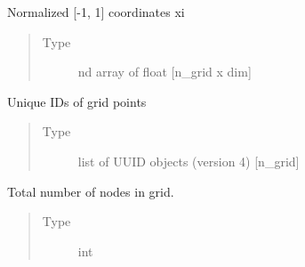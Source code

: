 \documentclass[letterpaper,10pt,english,openany,oneside]{sphinxmanual}
\begin{document}
\begin{fulllineitems}
\begin{fulllineitems}
\begin{quote}
\begin{description}
\end{description}\end{quote}

\end{fulllineitems}


\begin{fulllineitems}
\label{\detokenize{pygpc:pygpc.Grid.Grid._coords_norm}}
Normalized {[}-1, 1{]} coordinates xi
\begin{quote}\begin{description}
\item[{Type}] \leavevmode
nd array of float {[}n\_grid x dim{]}

\end{description}\end{quote}

\end{fulllineitems}


\begin{fulllineitems}
\label{\detokenize{pygpc:pygpc.Grid.Grid.coords_id}}
Unique IDs of grid points
\begin{quote}\begin{description}
\item[{Type}] \leavevmode
list of UUID objects (version 4) {[}n\_grid{]}

\end{description}\end{quote}

\end{fulllineitems}


\begin{fulllineitems}
\label{\detokenize{pygpc:pygpc.Grid.Grid.n_grid}}
Total number of nodes in grid.
\begin{quote}\begin{description}
\item[{Type}] \leavevmode
int

\end{description}\end{quote}


\end{fulllineitems}
\end{fulllineitems}
\end{document}
